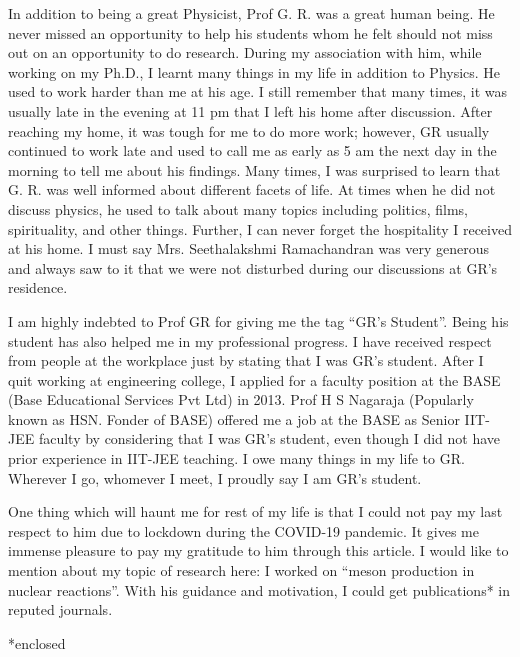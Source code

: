 In addition to being a great Physicist, Prof G. R. was a great human being. He never missed an opportunity to help his students whom he felt should not miss out on an opportunity to do research. During my association with him, while working on my Ph.D., I learnt many things in my life in addition to Physics. He used to work harder than me at his age. I still remember that many times, it was usually late in the evening at 11 pm that I left his home after discussion. After reaching my home, it was tough for me to do more work; however, GR usually continued to work late and used to call me as early as 5 am the next day in the morning to tell me about his findings. Many times, I was surprised to learn that G. R. was well informed about different facets of life. At times when he did not discuss physics, he used to talk about many topics including politics, films, spirituality, and other things. Further, I can never forget the hospitality I received at his home. I must say Mrs. Seethalakshmi Ramachandran was very generous and always saw to it that we were not disturbed during our discussions at GR’s residence.

I am highly indebted to Prof GR for giving me the tag “GR’s Student”. Being his student has also helped me in my professional progress. I have received respect from people at the workplace just by stating that I was GR’s student. After I quit working at engineering college, I applied for a faculty position at the BASE (Base Educational Services Pvt Ltd) in 2013. Prof H S Nagaraja (Popularly known as HSN. Fonder of BASE) offered me a job at the BASE as Senior IIT-JEE faculty by considering that I was GR’s student, even though I did not have prior experience in IIT-JEE teaching. I owe many things in my life to GR. Wherever I go, whomever I meet, I proudly say I am GR’s student. 

One thing which will haunt me for rest of my life is that I could not pay my last respect to him due to lockdown during the COVID-19 pandemic. It gives me immense pleasure to pay my gratitude to him through this article. I would like to mention about my topic of research here: I worked on “meson production in nuclear reactions”. With his guidance and motivation, I could get publications* in reputed journals. 


*enclosed


